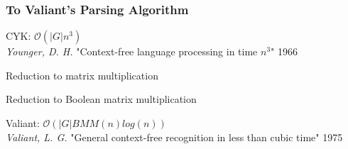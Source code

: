 \documentclass[xcolor=table]{beamer}
\begin{document}
\begin{frame}[fragile] \frametitle{To Valiant's Parsing Algorithm}

    \begin{center}
        
    CYK: $\mathcal{O}(|G|n^3)$  \\
    \emph{Younger, D. H.} "Context-free language processing in time $n^3$" 1966
    
    \Downarrow 
    
    Reduction to matrix multiplication 
    
    \Downarrow 
    
    Reduction to Boolean matrix multiplication 
    
    \Downarrow 
    
    Valiant: $\mathcal{O}(|G|BMM(n)log(n))$ \\
    \emph{Valiant, L. G.} "General context-free recognition in less than cubic time" 1975
    
    \end{center}


\end{frame}
\end{document}
